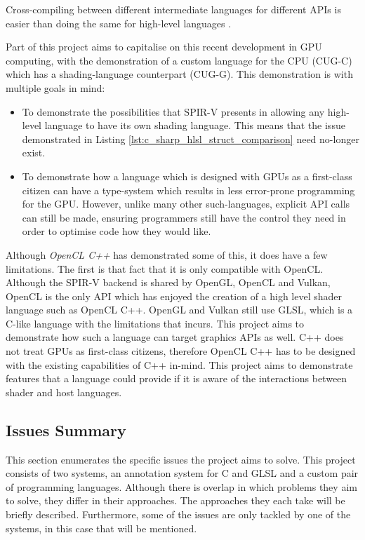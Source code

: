 \documentclass[a4paper,12pt,twoside,openright]{report}
\begin{document}
Cross-compiling between different intermediate languages for different APIs is
easier than doing the same for high-level languages \cite{TODO}.

Part of this project aims to capitalise on this recent development in GPU
computing, with the demonstration of a custom language for the CPU (CUG-C)
which has a shading-language counterpart (CUG-G). This demonstration is with
multiple goals in mind:

\begin{itemize}

    \item To demonstrate the possibilities that SPIR-V presents in allowing any
    high-level language to have its own shading language. This means that the
    issue demonstrated in Listing \ref{lst:c_sharp_hlsl_struct_comparison}
    need no-longer exist.

    \item To demonstrate how a language which is designed with GPUs as a
    first-class citizen can have a type-system which results in less
    error-prone programming for the GPU. However, unlike many other
    such-languages, explicit API calls can still be made, ensuring programmers
    still have the control they need in order to optimise code how they would
    like.

\end{itemize}

Although \textit{OpenCL C++} has demonstrated some of this, it does have a few
limitations. The first is that fact that it is only compatible with OpenCL.
Although the SPIR-V backend is shared by OpenGL, OpenCL and Vulkan, OpenCL is
the only API which has enjoyed the creation of a high level shader language
such as OpenCL C++. OpenGL and Vulkan still use GLSL, which is a C-like
language with the limitations that incurs. This project aims to demonstrate how
such a language can target graphics APIs as well. C++ does not treat GPUs as
first-class citizens, therefore OpenCL C++ has to be designed with the existing
capabilities of C++ in-mind. This project aims to demonstrate features that a
language could provide if it is aware of the interactions between shader and
host languages.

\subsection{Issues Summary}

\label{sec:issues_summary}

This section enumerates the specific issues the project aims to solve. This
project consists of two systems, an annotation system for C and GLSL and a
custom pair of programming languages. Although there is overlap in which
problems they aim to solve, they differ in their approaches. The approaches
they each take will be briefly described. Furthermore, some of the issues are
only tackled by one of the systems, in this case that will be mentioned.
\end{document}
